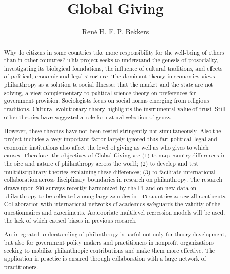 \documentclass[twocolumn, serif, rga, numeric]{jote-article}
\title{Global Giving}
\author[1]{Ren\'e H. F. P. Bekkers }
\affil[1]{Center for Philanthropic Studies, Department of Sociology, Faculty of Social Science, Vrije Universiteit Amsterdam}
\begin{document}
\setcounter{page}{72}

\begin{frontmatter}
\maketitle
\begin{abstract}
Why do citizens in some countries take more responsibility for the well-being of others than in other countries? This project seeks to understand the genesis of prosociality, investigating its biological foundations, the influence of cultural traditions, and effects of political, economic and legal structure. The dominant theory in economics views philanthropy as a solution to social illnesses that the market and the state are not solving, a view complementary to political science theory on preferences for government provision. Sociologists focus on social norms emerging from religious traditions. Cultural evolutionary theory highlights the instrumental value of trust. Still other theories have suggested a role for natural selection of genes.

However, these theories have not been tested stringently nor simultaneously. Also the project includes a very important factor largely ignored thus far: political, legal and economic institutions also affect the level of giving as well as who gives to which causes.
Therefore, the objectives of Global Giving are (1) to map country differences in the size and nature of philanthropy across the world; (2) to develop and test multidisciplinary theories explaining these differences; (3) to facilitate international collaboration across disciplinary boundaries in research on philanthropy. The research draws upon 200 surveys recently harmonized by the PI and on new data on philanthropy to be collected among large samples in 145 countries across all continents. Collaboration with international networks of academics safeguards the validity of the questionnaires and experiments. Appropriate multilevel regression models will be used, the lack of which caused biases in previous research.

An integrated understanding of philanthropy is useful not only for theory development, but also for government policy makers and practitioners in nonprofit organizations seeking to mobilize philanthropic contributions and make them more effective. The application in practice is ensured through collaboration with a large network of practitioners.
\end{abstract}
\end{frontmatter}
\end{document}
